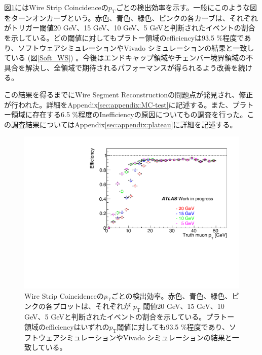 図\ref{SM_A_WS_turnon}にはWire Strip Coincidenceの$p_\mathrm{T}$ごとの検出効率を示す。一般にこのような図をターンオンカーブという。赤色、青色、緑色、ピンクの各カーブは、それぞれがトリガー閾値20 GeV、15 GeV、10 GeV、5 GeVと判断されたイベントの割合を示している。どの\pt 閾値に対してもプラトー領域のefficiencyは93.5 \%程度であり、ソフトウェアシミュレーションやVivado シミュレーションの結果と一致している (図\ref{Soft_WS}) 。今後はエンドキャップ領域やチェンバー境界領域の不具合を解決し、全領域で期待されるパフォーマンスが得られるよう改善を続ける。

この結果を得るまでにWire Segment Reconstructionの問題点が発見され、修正が行われた。詳細をAppendix\ref{sec:appendix:MC-test}に記述する。また、プラトー領域に存在する6.5 \%程度のInefficiencyの原因についてもの調査を行った。この調査結果についてはAppendix\ref{sec:appendix:plateau}に詳細を記述する。

\begin{figure} 
\centering
\includegraphics[width=16cm]{fig/Test/A_SM_ws_turn.pdf}   
\caption[]{Wire Strip Coincidenceの$p_\mathrm{T}$ごとの検出効率。赤色、青色、緑色、ピンクの各プロットは、それぞれが $p_{\mathrm{T}}$ 閾値20 GeV、15 GeV、10 GeV、5 GeVと判断されたイベントの割合を示している。プラトー領域のefficiencyはいずれの$p_{\mathrm{T}}$閾値に対しても93.5 \%程度であり、ソフトウェアシミュレーションやVivado シミュレーションの結果と一致している。}
\label{SM_A_WS_turnon}
\end{figure}




